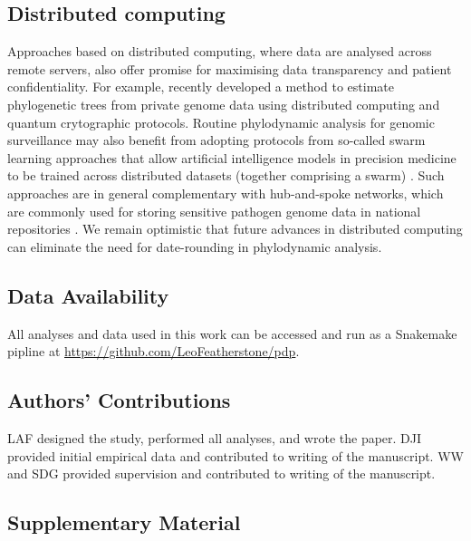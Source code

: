 \documentclass[12pt]{article}
\begin{document}
\begin{spacing}{2}
\subsection*{Distributed computing}
Approaches based on distributed computing, where data are analysed across remote servers, also offer promise for maximising data transparency and patient confidentiality. For example, \citet{santos_private_2022} recently developed a method to estimate phylogenetic trees from private genome data using distributed computing and quantum crytographic protocols. Routine phylodynamic analysis for genomic surveillance may also benefit from adopting protocols from so-called swarm learning approaches that allow artificial intelligence models in precision medicine to be trained across distributed datasets (together comprising a swarm) \citep{warnat-herresthal_swarm_2021}. Such approaches are in general complementary with hub-and-spoke networks, which are commonly used for storing sensitive pathogen genome data in national repositories \citep{hoang_austrakka_2022}. We remain optimistic that future advances in distributed computing can eliminate the need for date-rounding in phylodynamic analysis.

\subsection*{Data Availability}
All analyses and data used in this work can be accessed and run as a Snakemake pipline at \href{https://github.com/LeoFeatherstone/pdp}{https://github.com/LeoFeatherstone/pdp}.

\subsection*{Authors' Contributions}
LAF designed the study, performed all analyses, and wrote the paper. DJI provided initial empirical data and contributed to writing of the manuscript. WW and SDG provided supervision and contributed to writing of the manuscript.

\end{spacing}




\subsection*{Supplementary Material}
\end{document}

